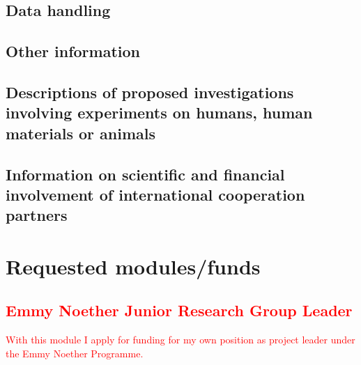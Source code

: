 \documentclass[a4paper,11pt,numbers=noenddot,parskip=half-]{scrreprt}
\begin{document}
\subsection{Data handling}
\myblindtext[2]

\subsection{Other information}
\myblindtext

\subsection{Descriptions of proposed investigations involving experiments on humans, human materials or animals}
\myblindtext

\subsection{Information on scientific and financial involvement of international cooperation partners}
\myblindtext

\renewcommand{\bibsection}{\section{Bibliography}}




\section{Requested modules/funds}
\subsection{\textcolor{red}{Emmy Noether Junior Research Group Leader}}
\textcolor{red}{With this module I apply for funding for my own position as project leader under
the Emmy Noether Programme.}

\end{document}
